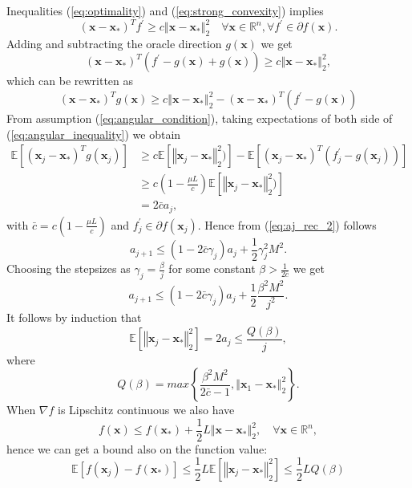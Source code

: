 \documentclass{article}
\renewcommand{\vec}[1]{\boldsymbol{#1}}
\newcommand{\norm}[1]{\left\Vert #1 \right\Vert}
\begin{document}
Inequalities (\ref{eq:optimality}) and (\ref{eq:strong_convexity}) implies
\begin{equation}
	(\vec{x}-\vec{x}_*)^T f^\prime \geq c \norm{\vec{x}-\vec{x}_*}^2_2 \quad \forall \vec{x} \in \mathbb{R}^n, \forall f^\prime\in\partial f(\vec{x}).
\end{equation}
Adding and subtracting the oracle direction $g(\vec{x})$ we get
\begin{equation}
	(\vec{x}-\vec{x}_*)^T (f^\prime -g(\vec{x}) +g(\vec{x})) \geq c \norm{\vec{x}-\vec{x}_*}^2_2,
\end{equation}
which can be rewritten as
\begin{equation}
		(\vec{x}-\vec{x}_*)^T g(\vec{x}) \geq c \norm{\vec{x}-\vec{x}_*}^2_2 - (\vec{x}-\vec{x}_*)^T (f^\prime -g(\vec{x}))
		\label{eq:angular_inequality}
\end{equation}
From assumption (\ref{eq:angular_condition}), taking expectations of both side of (\ref{eq:angular_inequality}) we obtain
\begin{align}
\mathbb{E}[(\vec{x}_j-\vec{x}_*)^T g(\vec{x}_j)] &\geq c \mathbb{E}[\norm{\vec{x}_j-\vec{x}_*}^2_2)] - \mathbb{E}[(\vec{x}_j-\vec{x}_*)^T (f_j^\prime -g(\vec{x}_j))]\\
 &\geq c(1-\frac{\mu L}{c}) \mathbb{E}[\norm{\vec{x}_j-\vec{x}_*}^2_2)]\\
 & = 2\bar{c}a_j,
\end{align}
with $\bar{c}=c(1-\frac{\mu L }{c})$ and $f_j^\prime \in \partial f(\vec{x}_j)$.
Hence from (\ref{eq:aj_rec_2}) follows 
\begin{equation}
	a_{j+1} \leq (1-2\bar{c}\gamma_j)a_j + \frac{1}{2}\gamma_j^2M^2.
\end{equation}
Choosing the stepsizes as $\gamma_j = \frac{\beta}{j}$ for some constant $\beta>\frac{1}{2\bar{c}}$ we get
\begin{equation}
		a_{j+1} \leq (1-2\bar{c}\gamma_j)a_j + \frac{1}{2}\frac{\beta^2M^2}{j^2}.
\end{equation}
It follows by induction that
\begin{equation}
	\mathbb{E}[\norm{\vec{x}_j - \vec{x}_*}^2_2] = 2a_j\leq \frac{Q(\beta)}{j},
\end{equation}
where 
\begin{equation}
	Q(\beta) = max\left\{\frac{\beta^2M^2}{2\bar{c}-1},\norm{\vec{x}_1 - \vec{x}_*}^2_2 \right\}.
\end{equation}
When $\nabla f$ is Lipschitz continuous we also have
\begin{equation}
	f(\vec{x})\leq f(\vec{x}_*) + \frac{1}{2}L\norm{\vec{x} - \vec{x}_*}^2_2, \quad \forall \vec{x} \in \mathbb{R}^n,
\end{equation}
hence we can get a bound also on the function value:
\begin{equation}
	\mathbb{E}[f(\vec{x}_j)-f(\vec{x}_*)] \leq \frac{1}{2} L \mathbb{E}[\norm{\vec{x}_j - \vec{x}_*}^2_2] \leq \frac{1}{2}LQ(\beta)
\end{equation}
\end{document}

